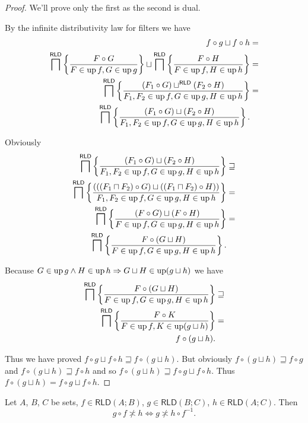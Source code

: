 \begin{proof}
We'll prove only the first as the second is dual.

By the infinite distributivity law for filters we have
\begin{align*}
f\circ g\sqcup f\circ h & =\\
\bigsqcap^{\mathsf{RLD}}\left\{ \frac{F\circ G}{F\in\operatorname{up} f,G\in\operatorname{up} g}\right\}\sqcup\bigsqcap^{\mathsf{RLD}}\left\{ \frac{F\circ H}{F\in\operatorname{up} f,H\in\operatorname{up} h}\right\} & =\\
\bigsqcap^{\mathsf{RLD}}\left\{ \frac{(F_{1}\circ G)\sqcup^{\mathsf{RLD}}(F_{2}\circ H)}{F_{1},F_{2}\in\operatorname{up} f,G\in\operatorname{up} g,H\in\operatorname{up} h}\right\} & =\\
\bigsqcap^{\mathsf{RLD}}\left\{ \frac{(F_{1}\circ G)\sqcup(F_{2}\circ H)}{F_{1},F_{2}\in\operatorname{up} f,G\in\operatorname{up} g,H\in\operatorname{up} h}\right\}.
\end{align*}


Obviously
\begin{align*}
\bigsqcap^{\mathsf{RLD}}\left\{ \frac{(F_{1}\circ G)\sqcup(F_{2}\circ H)}{F_{1},F_{2}\in\operatorname{up} f,G\in\operatorname{up} g,H\in\operatorname{up} h}\right\} & \sqsupseteq\\
\bigsqcap^{\mathsf{RLD}}\left\{ \frac{(((F_{1}\sqcap F_{2})\circ G)\sqcup((F_{1}\sqcap F_{2})\circ H))}{F_{1},F_{2}\in\operatorname{up} f,G\in\operatorname{up} g,H\in\operatorname{up} h}\right\} & =\\
\bigsqcap^{\mathsf{RLD}}\left\{ \frac{(F\circ G)\sqcup(F\circ H)}{F\in\operatorname{up} f,G\in\operatorname{up} g,H\in\operatorname{up} h}\right\} & =\\
\bigsqcap^{\mathsf{RLD}}\left\{ \frac{F\circ(G\sqcup H)}{F\in\operatorname{up} f,G\in\operatorname{up} g,H\in\operatorname{up} h}\right\}.
\end{align*}


Because $G\in\operatorname{up} g\land H\in\operatorname{up} h\Rightarrow G\sqcup H\in\operatorname{up}(g\sqcup h)$
we have
\begin{align*}
\bigsqcap^{\mathsf{RLD}}\left\{ \frac{F\circ(G\sqcup H)}{F\in\operatorname{up} f,G\in\operatorname{up} g,H\in\operatorname{up} h}\right\} & \sqsupseteq\\
\bigsqcap^{\mathsf{RLD}}\left\{ \frac{F\circ K}{F\in\operatorname{up} f,K\in\operatorname{up}(g\sqcup h)}\right\} & =\\
f\circ(g\sqcup h).
\end{align*}


Thus we have proved $f\circ g\sqcup f\circ h\sqsupseteq f\circ(g\sqcup h)$.
But obviously $f\circ(g\sqcup h)\sqsupseteq f\circ g$ and $f\circ(g\sqcup h)\sqsupseteq f\circ h$
and so $f\circ(g\sqcup h)\sqsupseteq f\circ g\sqcup f\circ h$. Thus
$f\circ(g\sqcup h)=f\circ g\sqcup f\circ h$.\end{proof}
\begin{thm}
\label{rld-cross}Let $A$, $B$, $C$ be sets, $f\in\mathsf{RLD}(A;B)$,
$g\in\mathsf{RLD}(B;C)$, $h\in\mathsf{RLD}(A;C)$. Then
\[
g\circ f\nasymp h\Leftrightarrow g\nasymp h\circ f^{-1}.
\]
\end{thm}
